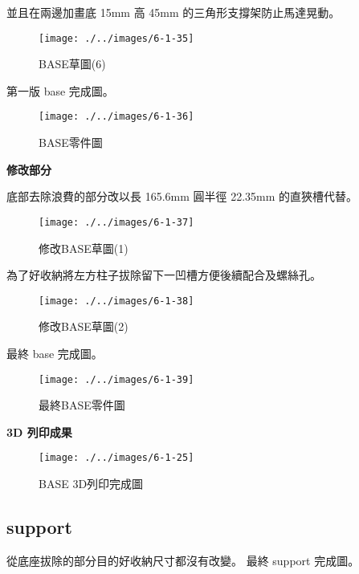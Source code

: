 \newpage

並且在兩邊加畫底 15mm 高 45mm 的三角形支撐架防止馬達晃動。

\begin{figure}[htbp]
    \centering
    \texttt{[image: ./../images/6-1-35]}
    \caption{BASE草圖(6)}
\end{figure}

第一版 base 完成圖。

\begin{figure}[htbp]
    \centering
    \texttt{[image: ./../images/6-1-36]}
    \caption{BASE零件圖}
\end{figure}

\newpage

\textbf{修改部分}

底部去除浪費的部分改以長 165.6mm 圓半徑 22.35mm 的直狹槽代替。

\begin{figure}[htbp]
    \centering
    \texttt{[image: ./../images/6-1-37]}
    \caption{修改BASE草圖(1)}
\end{figure}

為了好收納將左方柱子拔除留下一凹槽方便後續配合及螺絲孔。

\begin{figure}[htbp]
    \centering
    \texttt{[image: ./../images/6-1-38]}
    \caption{修改BASE草圖(2)}
\end{figure}

\newpage

最終 base 完成圖。

\begin{figure}[htbp]
    \centering
    \texttt{[image: ./../images/6-1-39]}
    \caption{最終BASE零件圖}
\end{figure}

\textbf{3D 列印成果}

\begin{figure}[htbp]
    \centering
    \texttt{[image: ./../images/6-1-25]}
    \caption{BASE 3D列印完成圖}
\end{figure}

\newpage

\subsection{support}

從底座拔除的部分目的好收納尺寸都沒有改變。
最終 support 完成圖。

